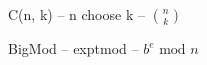 

\begin{algorithm}{C(n, k) -- n choose k -- ${n \choose k}$}
\end{algorithm}

\begin{algorithm}{BigMod -- exptmod -- $b^e \textrm{ mod } n$}
\end{algorithm}
